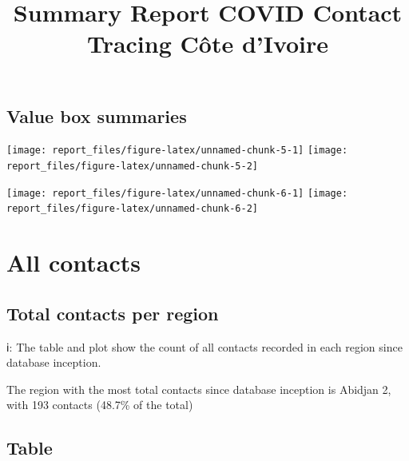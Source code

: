 \documentclass[
  10pt,
]{article}
\title{Summary Report COVID Contact Tracing Côte d'Ivoire}
\author{}
\date{\vspace{-2.5em}}
\begin{document}
\maketitle

{
\setcounter{tocdepth}{2}
\tableofcontents
}

\hypertarget{value-box-summaries}{%
\subsection{Value box summaries}\label{value-box-summaries}}

\texttt{[image: report\_files/figure-latex/unnamed-chunk-5-1]}
\texttt{[image: report\_files/figure-latex/unnamed-chunk-5-2]}

\texttt{[image: report\_files/figure-latex/unnamed-chunk-6-1]}
\texttt{[image: report\_files/figure-latex/unnamed-chunk-6-2]}

\hypertarget{all-contacts}{%
\section{All contacts}\label{all-contacts}}

\hypertarget{total-contacts-per-region}{%
\subsection{Total contacts per region}\label{total-contacts-per-region}}

ℹ: The table and plot show the count of all contacts recorded in each
region since database inception.

The region with the most total contacts since database inception is
Abidjan 2, with 193 contacts (48.7\% of the total)

\hypertarget{table}{%
\subsection{Table}\label{table}}

 
  \providecommand{\huxb}[2]{\arrayrulecolor[RGB]{#1}\global\arrayrulewidth=#2pt}
  \providecommand{\huxvb}[2]{\color[RGB]{#1}\vrule width #2pt}
  \providecommand{\huxtpad}[1]{\rule{0pt}{#1}}
  \providecommand{\huxbpad}[1]{\rule[-#1]{0pt}{#1}}
\end{document}
